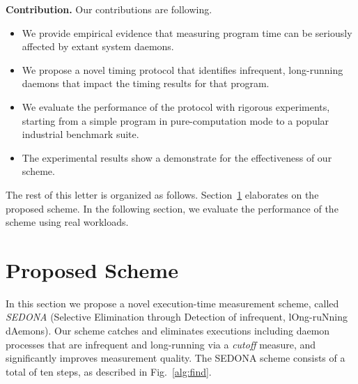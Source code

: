 \documentclass[letter]{ieice}
\begin{document}
{\bf Contribution.} 
Our contributions are following.
\vspace{-0.05in}
\begin{itemize}

\item We provide empirical evidence that 
measuring program time 
can be seriously affected by extant system daemons.

\item We propose a novel timing protocol that
identifies infrequent, long-running daemons that impact the timing results for that program. 

\item We evaluate the performance of the protocol with rigorous experiments, 
starting from a simple program in pure-computation mode 
to a popular industrial benchmark suite.


\item The experimental results show a demonstrate for the effectiveness of our scheme. 

\end{itemize}
\vspace{-0.05in}

\noindent
The rest of this letter is organized as follows. 
Section~\ref{sec:prop_appach} elaborates on the proposed scheme. 
In the following section, we evaluate the performance of 
the scheme using real workloads.


\section{Proposed Scheme}
\label{sec:prop_appach}

In this section we propose a novel execution-time measurement scheme, 
called {\em SEDONA} (Selective Elimination through Detection of infrequent, lOng-ruNning dAemons). 
Our scheme catches and eliminates executions including daemon processes that are infrequent and 
long-running via a {\em cutoff} measure, and significantly improves measurement quality. 
The SEDONA scheme consists of a total of ten steps, as described in Fig.~\ref{alg:find}. 
\end{document}
